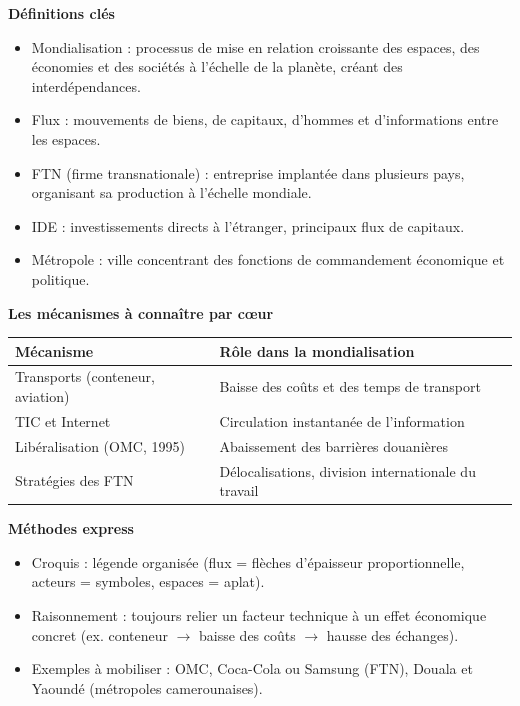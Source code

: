 \documentclass[11pt]{article}
\newcommand{\cle}[1]{{\popxbold\color{popdark}#1}}
\begin{document}
\begin{bilan}
\textbf{Définitions clés}
\begin{itemize}
  \item \cle{Mondialisation} : processus de mise en relation croissante des espaces, des économies et des sociétés à l'échelle de la planète, créant des interdépendances.
  \item \cle{Flux} : mouvements de biens, de capitaux, d'hommes et d'informations entre les espaces.
  \item \cle{FTN} (firme transnationale) : entreprise implantée dans plusieurs pays, organisant sa production à l'échelle mondiale.
  \item \cle{IDE} : investissements directs à l'étranger, principaux flux de capitaux.
  \item \cle{Métropole} : ville concentrant des fonctions de commandement économique et politique.
\end{itemize}
\textbf{Les mécanismes à connaître par cœur}
\begin{center}
\begin{tabularx}{\linewidth}{|l|X|}\hline
\rowcolor{popblueL} \textbf{Mécanisme} & \textbf{Rôle dans la mondialisation} \\ \hline
Transports (conteneur, aviation) & Baisse des coûts et des temps de transport \\ \hline
TIC et Internet & Circulation instantanée de l'information \\ \hline
Libéralisation (OMC, 1995) & Abaissement des barrières douanières \\ \hline
Stratégies des FTN & Délocalisations, division internationale du travail \\ \hline
\end{tabularx}
\end{center}
\textbf{Méthodes express}
\begin{itemize}
  \item Croquis : légende organisée (flux = flèches d'épaisseur proportionnelle, acteurs = symboles, espaces = aplat).
  \item Raisonnement : toujours relier un facteur technique à un effet économique concret (ex. conteneur $\rightarrow$ baisse des coûts $\rightarrow$ hausse des échanges).
  \item Exemples à mobiliser : OMC, Coca-Cola ou Samsung (FTN), Douala et Yaoundé (métropoles camerounaises).
\end{itemize}
\end{bilan}
\end{document}
